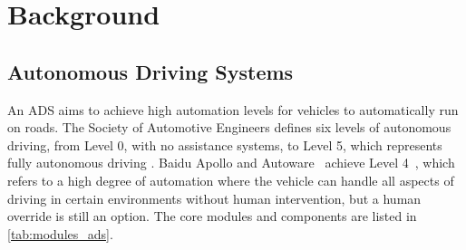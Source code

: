 \section{Background}\label{sec:background}

\subsection{Autonomous Driving Systems}

An ADS aims to achieve high automation levels for vehicles to automatically run on roads. 
The Society of Automotive Engineers defines six levels of autonomous driving, from Level 0, with no assistance systems, to Level 5, which represents fully autonomous driving \cite{RodelSMT14}. 
Baidu Apollo \cite{apollo} and Autoware~\cite{autoware} achieve Level 4~\cite{apollo_level_4}, which refers to a high degree of automation where the vehicle can handle all aspects of driving in certain environments without human intervention, but a human override is still an option.
The core modules and components are listed in \autoref{tab:modules_ads}.


